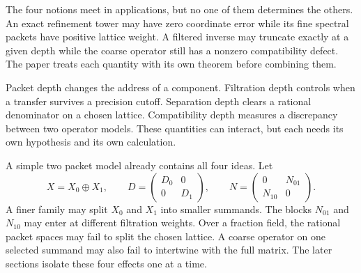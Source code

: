 The four notions meet in applications, but no one of them determines the others.  An exact refinement tower may have zero coordinate error while its fine spectral packets have positive lattice weight.  A filtered inverse may truncate exactly at a given depth while the coarse operator still has a nonzero compatibility defect.  The paper treats each quantity with its own theorem before combining them.

\begin{keyidea}
Packet depth changes the address of a component. Filtration depth controls when a transfer survives a precision cutoff. Separation depth clears a rational denominator on a chosen lattice. Compatibility depth measures a discrepancy between two operator models. These quantities can interact, but each needs its own hypothesis and its own calculation.
\end{keyidea}

A simple two packet model already contains all four ideas.  Let
\[
X=X_0\oplus X_1,
\qquad
D=\begin{pmatrix}D_0&0\\0&D_1\end{pmatrix},
\qquad
N=\begin{pmatrix}0&N_{01}\\N_{10}&0\end{pmatrix}.
\]
A finer family may split $X_0$ and $X_1$ into smaller summands.  The blocks $N_{01}$ and $N_{10}$ may enter at different filtration weights.  Over a fraction field, the rational packet spaces may fail to split the chosen lattice.  A coarse operator on one selected summand may also fail to intertwine with the full matrix.  The later sections isolate these four effects one at a time.

